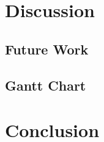 \documentclass{acmart}
\begin{document}
\section{Discussion} %

\subsection{Future Work} %

\subsection{Gantt Chart}

\section{Conclusion}
\end{document}
